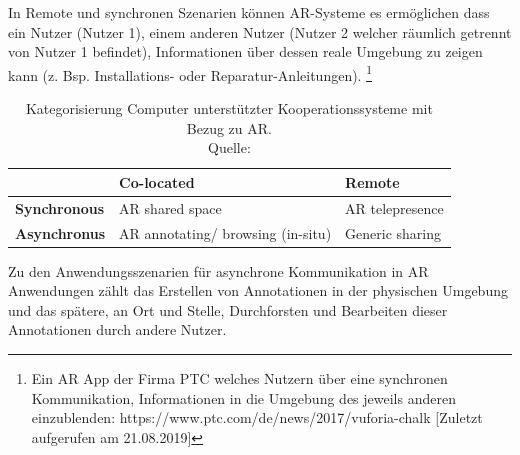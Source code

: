 In Remote und synchronen Szenarien können AR-Systeme es ermöglichen dass ein Nutzer (Nutzer 1), einem anderen Nutzer (Nutzer 2 welcher räumlich getrennt von Nutzer 1 befindet), 
Informationen über dessen reale Umgebung zu zeigen kann (z. Bsp. Installations- oder Reparatur-Anleitungen). \footnote{Ein AR App der Firma PTC welches Nutzern über eine synchronen Kommunikation, Informationen in die Umgebung des jeweils anderen einzublenden: https://www.ptc.com/de/news/2017/vuforia-chalk [Zuletzt aufgerufen am 21.08.2019]} 

\begin{table}[htbp]
\caption{Kategorisierung Computer unterstützter Kooperationssysteme mit Bezug zu AR. \\Quelle: \cite[S.~362]{DieterSchmalstieg2016}}
	\begin{center}
		\begin{tabular}{|l|ll|}
		\hline
		 & \textbf{Co-located} & \textbf{Remote}\\
		\hline
		\textbf{Synchronous} &  AR shared space & AR telepresence \\
		\textbf{Asynchronus} & AR annotating/ browsing (in-situ) & Generic sharing\\
		\hline
		\end{tabular}
	\end{center}
	\label{tab:categorycscw}
\end{table}

\cite[S.~362]{DieterSchmalstieg2016} Zu den Anwendungsszenarien für asynchrone Kommunikation in AR Anwendungen zählt das Erstellen von Annotationen in der 
physischen Umgebung und das spätere, an Ort und Stelle, Durchforsten und Bearbeiten dieser Annotationen durch andere Nutzer.		

